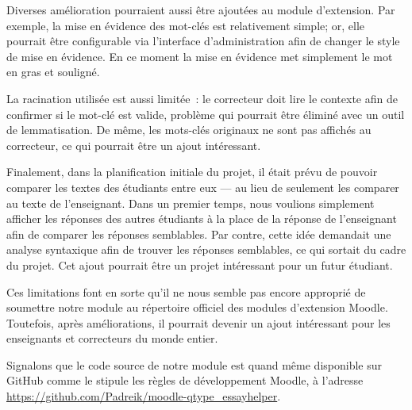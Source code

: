Diverses am\'elioration pourraient aussi \^etre ajout\'ees au module d'extension.
Par exemple, la mise en \'evidence des mot-cl\'es est relativement simple; or, elle pourrait \^etre configurable via l'interface d'administration afin de changer le style de mise en \'evidence.
En ce moment la mise en \'evidence met simplement le mot en gras et soulign\'e.

La racination utilis\'ee est aussi limit\'ee~: le correcteur doit lire le contexte afin de confirmer si le mot-cl\'e est valide, probl\`eme qui pourrait \^etre \'elimin\'e avec un outil de lemmatisation.
De m\^eme, les mots-cl\'es originaux ne sont pas affich\'es au correcteur, ce qui pourrait \^etre un ajout int\'eressant.

Finalement, dans la planification initiale du projet, il \'etait pr\'evu de pouvoir comparer les textes des \'etudiants entre eux --- au lieu de seulement les comparer au texte de l'enseignant.
Dans un premier temps, nous voulions simplement afficher les r\'eponses des autres \'etudiants \`a la place de la r\'eponse de l'enseignant afin de comparer les r\'eponses semblables.
Par contre, cette id\'ee demandait une analyse syntaxique afin de trouver les r\'eponses semblables, ce qui sortait du cadre du projet.
Cet ajout pourrait \^etre un projet int\'eressant pour un futur \'etudiant.

Ces limitations font en sorte qu'il ne nous semble pas encore appropri\'e de soumettre
notre module au r\'epertoire officiel des modules d'extension Moodle.
Toutefois, apr\`es am\'eliorations, il pourrait devenir un ajout int\'eressant pour les enseignants et correcteurs du monde entier.

Signalons que
le code source de notre module est quand m\^eme disponible sur GitHub comme le stipule les r\`egles de d\'eveloppement Moodle, \`a l'adresse \url{https://github.com/Padreik/moodle-qtype_essayhelper}.
